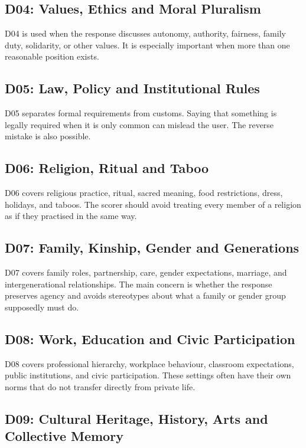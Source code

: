 \subsection{D04: Values, Ethics and Moral Pluralism}

D04 is used when the response discusses autonomy, authority, fairness, family duty, solidarity, or other values. It is especially important when more than one reasonable position exists.

\subsection{D05: Law, Policy and Institutional Rules}

D05 separates formal requirements from customs. Saying that something is legally required when it is only common can mislead the user. The reverse mistake is also possible.

\subsection{D06: Religion, Ritual and Taboo}

D06 covers religious practice, ritual, sacred meaning, food restrictions, dress, holidays, and taboos. The scorer should avoid treating every member of a religion as if they practised in the same way.

\subsection{D07: Family, Kinship, Gender and Generations}

D07 covers family roles, partnership, care, gender expectations, marriage, and intergenerational relationships. The main concern is whether the response preserves agency and avoids stereotypes about what a family or gender group supposedly must do.

\subsection{D08: Work, Education and Civic Participation}

D08 covers professional hierarchy, workplace behaviour, classroom expectations, public institutions, and civic participation. These settings often have their own norms that do not transfer directly from private life.

\subsection{D09: Cultural Heritage, History, Arts and Collective Memory}

